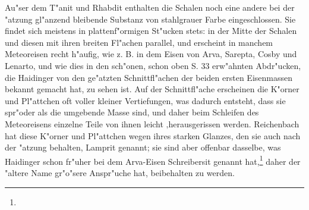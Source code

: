 \documentclass[a4paper, 11pt, oneside]{article}
\begin{document}
Au"ser dem T"anit und Rhabdit enthalten die Schalen noch eine andere bei der "atzung gl"anzend bleibende Substanz von stahlgrauer Farbe eingeschlossen. Sie findet sich meistens in plattenf"ormigen St"ucken stets: in der Mitte der Schalen und diesen mit ihren breiten Fl"achen parallel, und erscheint in manchem Meteoreisen recht h"aufig, wie z. B. in dem Eisen von Arva, Sarepta, Cosby und Lenarto, und wie dies in den sch"onen, schon oben S. 33 erw"ahnten Abdr"ucken, die Haidinger von den ge"atzten Schnittfl"achen der beiden ersten Eisenmassen bekannt gemacht hat, zu sehen ist. Auf der Schnittfl"ache erscheinen die K"orner und Pl"attchen oft voller kleiner Vertiefungen, was dadurch entsteht, dass sie spr"oder als die umgebende Masse sind, und daher beim Schleifen des Meteoreisens einzelne Teile von ihnen leicht ‚herausgerissen werden. Reichenbach hat diese K"orner und Pl"attchen wegen ihres starken Glanzes, den sie auch nach der "atzung behalten, Lamprit genannt; sie sind aber offenbar dasselbe, was Haidinger schon fr"uher bei dem Arva-Eisen Schreibersit genannt hat,\footnote{} daher der "altere Name gr"o"sere Anspr"uche hat, beibehalten zu werden.
\end{document}
